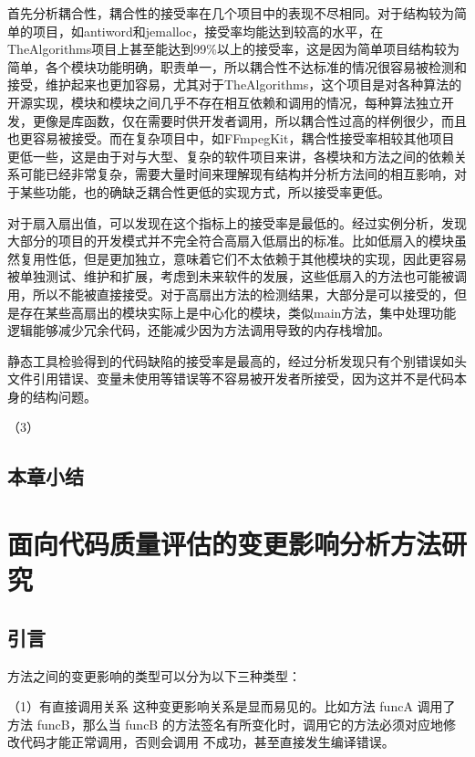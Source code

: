首先分析耦合性，耦合性的接受率在几个项目中的表现不尽相同。对于结构较为简单的项目，如antiword和jemalloc，接受率均能达到较高的水平，在TheAlgorithms项目上甚至能达到99\%以上的接受率，这是因为简单项目结构较为简单，各个模块功能明确，职责单一，所以耦合性不达标准的情况很容易被检测和接受，维护起来也更加容易，尤其对于TheAlgorithms，这个项目是对各种算法的开源实现，模块和模块之间几乎不存在相互依赖和调用的情况，每种算法独立开发，更像是库函数，仅在需要时供开发者调用，所以耦合性过高的样例很少，而且也更容易被接受。而在复杂项目中，如FFmpegKit，耦合性接受率相较其他项目更低一些，这是由于对与大型、复杂的软件项目来讲，各模块和方法之间的依赖关系可能已经非常复杂，需要大量时间来理解现有结构并分析方法间的相互影响，对于某些功能，也的确缺乏耦合性更低的实现方式，所以接受率更低。

对于扇入扇出值，可以发现在这个指标上的接受率是最低的。经过实例分析，发现大部分的项目的开发模式并不完全符合高扇入低扇出的标准。比如低扇入的模块虽然复用性低，但是更加独立，意味着它们不太依赖于其他模块的实现，因此更容易被单独测试、维护和扩展，考虑到未来软件的发展，这些低扇入的方法也可能被调用，所以不能被直接接受。对于高扇出方法的检测结果，大部分是可以接受的，但是存在某些高扇出的模块实际上是中心化的模块，类似main方法，集中处理功能逻辑能够减少冗余代码，还能减少因为方法调用导致的内存栈增加。

静态工具检验得到的代码缺陷的接受率是最高的，经过分析发现只有个别错误如头文件引用错误、变量未使用等错误等不容易被开发者所接受，因为这并不是代码本身的结构问题。

（3）


\section{本章小结}

\chapter{面向代码质量评估的变更影响分析方法研究}
\section{引言}
方法之间的变更影响的类型可以分为以下三种类型：

（1）有直接调用关系
这种变更影响关系是显而易见的。比如方法 funcA 调用了方法 funcB，那么当 funcB
的方法签名有所变化时，调用它的方法必须对应地修改代码才能正常调用，否则会调用
不成功，甚至直接发生编译错误。

